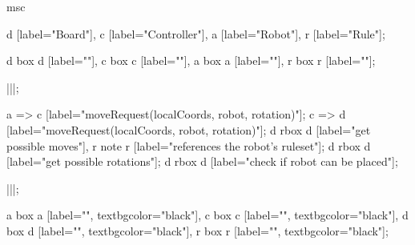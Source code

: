 \begin{msc}
msc
{

d [label="Board"],
c [label="Controller"],
a [label="Robot"],
r [label="Rule"];

d box d [label=""],
c box c [label=""],
a box a [label=""],
r box r [label=""];

|||;

a => c [label="moveRequest(localCoords, robot, rotation)"];
c => d [label="moveRequest(localCoords, robot, rotation)"];
d rbox d [label="get possible moves"], r note r [label="references the robot's ruleset"];
d rbox d [label="get possible rotations"];
d rbox d [label="check if robot can be placed"];

|||;

a box a [label="", textbgcolor="black"],
c box c [label="", textbgcolor="black"],
d box d [label="", textbgcolor="black"],
r box r [label="", textbgcolor="black"];

}
\end{msc}
